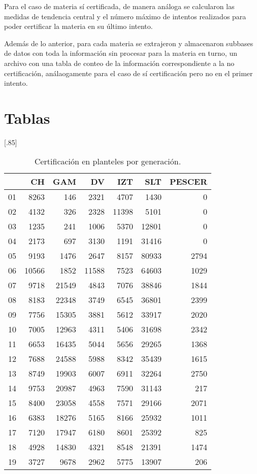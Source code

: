 \documentclass[12pt]{article}
\begin{document}
Para el caso de materia s\'i certificada, de manera an\'aloga se calcularon las medidas de tendencia central y el n\'umero m\'aximo de intentos realizados para poder certificar la materia en su \'ultimo intento. 

Adem\'as de lo anterior, para cada materia se extrajeron y almacenaron subbases de datos con toda la informaci\'on sin procesar para la materia en turno, un archivo con una tabla de conteo de la informaci\'on correspondiente a la no certificaci\'on, an\'alaogamente para el caso de s\'i certificaci\'on pero no en el primer intento. 


\section{Tablas}


\begin{table}[ht]
\centering
\scalebox{0.75}[.85]{
\begin{tabular}{rrrrrrr}
  \hline
 & CH & GAM & DV & IZT & SLT & PESCER \\ 
  \hline
01 & 8263 & 146 & 2321 & 4707 & 1430 &   0 \\ 
  02 & 4132 & 326 & 2328 & 11398 & 5101 &   0 \\ 
  03 & 1235 & 241 & 1006 & 5370 & 12801 &   0 \\ 
  04 & 2173 & 697 & 3130 & 1191 & 31416 &   0 \\ 
  05 & 9193 & 1476 & 2647 & 8157 & 80933 & 2794 \\ 
  06 & 10566 & 1852 & 11588 & 7523 & 64603 & 1029 \\ 
  07 & 9718 & 21549 & 4843 & 7076 & 38846 & 1844 \\ 
  08 & 8183 & 22348 & 3749 & 6545 & 36801 & 2399 \\ 
  09 & 7756 & 15305 & 3881 & 5612 & 33917 & 2020 \\ 
  10 & 7005 & 12963 & 4311 & 5406 & 31698 & 2342 \\ 
  11 & 6653 & 16435 & 5044 & 5656 & 29265 & 1368 \\ 
  12 & 7688 & 24588 & 5988 & 8342 & 35439 & 1615 \\ 
  13 & 8749 & 19903 & 6007 & 6911 & 32264 & 2750 \\ 
  14 & 9753 & 20987 & 4963 & 7590 & 31143 & 217 \\ 
  15 & 8400 & 23058 & 4558 & 7571 & 29166 & 2071 \\ 
  16 & 6383 & 18276 & 5165 & 8166 & 25932 & 1011 \\ 
  17 & 7120 & 17947 & 6180 & 8601 & 25392 & 825 \\ 
  18 & 4928 & 14830 & 4321 & 8548 & 21391 & 1474 \\ 
  19 & 3727 & 9678 & 2962 & 5775 & 13907 & 206 \\ 
   \hline
\end{tabular}}
\caption{\label{Cert_Gen_Plantel}Certificaci\'on en planteles por generaci\'on.}
\end{table}
\end{document}
